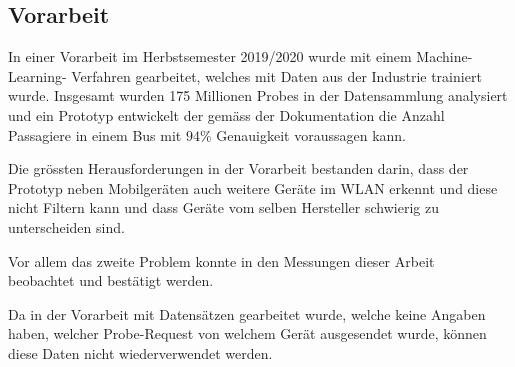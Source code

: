 \clearpage 

\subsection{Vorarbeit}
In einer Vorarbeit im Herbstsemester 2019/2020 wurde mit einem Machine-Learning-
Verfahren gearbeitet, welches mit Daten aus der Industrie trainiert wurde.
Insgesamt wurden 175 Millionen Probes in der Datensammlung analysiert und 
ein Prototyp entwickelt der gemäss der Dokumentation die Anzahl Passagiere 
in einem Bus mit $94\%$ Genauigkeit voraussagen kann. 

Die grössten Herausforderungen in der Vorarbeit bestanden darin, dass der Prototyp 
neben Mobilgeräten auch weitere Geräte im WLAN erkennt und diese nicht 
Filtern kann und dass Geräte vom selben Hersteller schwierig zu unterscheiden sind.

Vor allem das zweite Problem konnte in den Messungen dieser Arbeit \\ beobachtet und
bestätigt werden. 

Da in der Vorarbeit mit Datensätzen gearbeitet wurde, welche keine 
Angaben haben, welcher Probe-Request von welchem Gerät ausgesendet wurde, 
können diese Daten nicht wiederverwendet werden. 
\clearpage